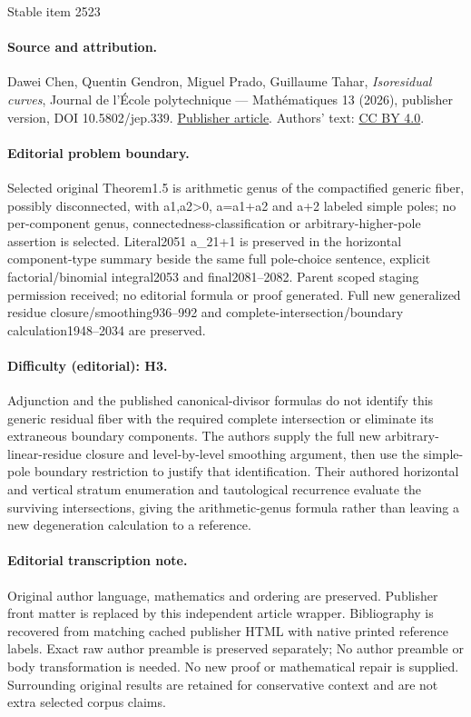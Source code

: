 \documentclass[11pt]{article}
\theoremstyle{definition}
\begin{document}
\begin{center}{\Large Stable item 2523}\end{center}
\paragraph{Source and attribution.}
Dawei Chen, Quentin Gendron, Miguel Prado, Guillaume Tahar, \emph{Isoresidual curves}, Journal de l’École polytechnique — Mathématiques 13 (2026), publisher version, DOI 10.5802/jep.339. \href{https://jep.centre-mersenne.org/articles/10.5802/jep.339/}{Publisher article}. Authors' text: \href{https://creativecommons.org/licenses/by/4.0/}{CC BY 4.0}.
\paragraph{Editorial problem boundary.}
Selected original Theorem1.5 is arithmetic genus of the compactified generic fiber, possibly disconnected, with a1,a2>0, a=a1+a2 and a+2 labeled simple poles; no per-component genus, connectedness-classification or arbitrary-higher-pole assertion is selected. Literal2051 a\_21+1 is preserved in the horizontal component-type summary beside the same full pole-choice sentence, explicit factorial/binomial integral2053 and final2081–2082. Parent scoped staging permission received; no editorial formula or proof generated. Full new generalized residue closure/smoothing936–992 and complete-intersection/boundary calculation1948–2034 are preserved.
\paragraph{Difficulty (editorial): H3.}
Adjunction and the published canonical-divisor formulas do not identify this generic residual fiber with the required complete intersection or eliminate its extraneous boundary components. The authors supply the full new arbitrary-linear-residue closure and level-by-level smoothing argument, then use the simple-pole boundary restriction to justify that identification. Their authored horizontal and vertical stratum enumeration and tautological recurrence evaluate the surviving intersections, giving the arithmetic-genus formula rather than leaving a new degeneration calculation to a reference.
\paragraph{Editorial transcription note.}
Original author language, mathematics and ordering are preserved. Publisher front matter is replaced by this independent article wrapper. Bibliography is recovered from matching cached publisher HTML with native printed reference labels. Exact raw author preamble is preserved separately; No author preamble or body transformation is needed. No new proof or mathematical repair is supplied. Surrounding original results are retained for conservative context and are not extra selected corpus claims.
\clearpage
\end{document}
